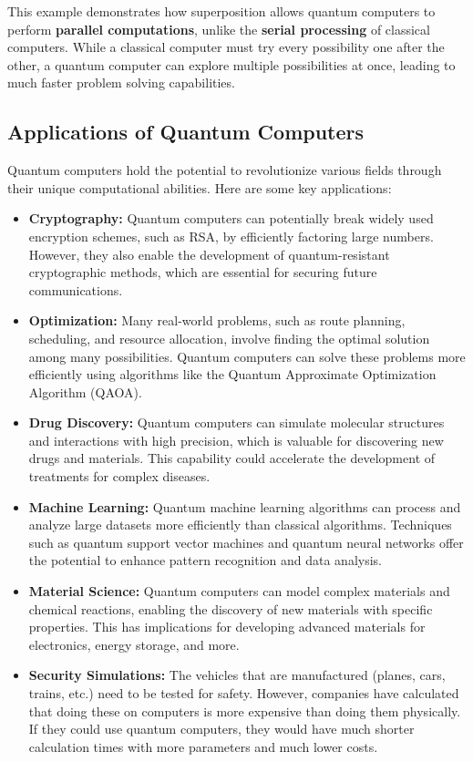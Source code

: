 \documentclass{article}
\begin{document}
This example demonstrates how superposition allows quantum computers to perform \textbf{parallel computations}, unlike the \textbf{serial processing} of classical computers. While a classical computer must try every possibility one after the other, a quantum computer can explore multiple possibilities at once, leading to much faster problem solving capabilities.
\subsection{Applications of Quantum Computers}

Quantum computers hold the potential to revolutionize various fields through their unique computational abilities. Here are some key applications:

\begin{itemize}
    \item \textbf{Cryptography:} Quantum computers can potentially break widely used encryption schemes, such as RSA, by efficiently factoring large numbers. However, they also enable the development of quantum-resistant cryptographic methods, which are essential for securing future communications.
    
    \item \textbf{Optimization:} Many real-world problems, such as route planning, scheduling, and resource allocation, involve finding the optimal solution among many possibilities. Quantum computers can solve these problems more efficiently using algorithms like the Quantum Approximate Optimization Algorithm (QAOA).
    
    \item \textbf{Drug Discovery:} Quantum computers can simulate molecular structures and interactions with high precision, which is valuable for discovering new drugs and materials. This capability could accelerate the development of treatments for complex diseases.
    
    \item \textbf{Machine Learning:} Quantum machine learning algorithms can process and analyze large datasets more efficiently than classical algorithms. Techniques such as quantum support vector machines and quantum neural networks offer the potential to enhance pattern recognition and data analysis.
    
    \item \textbf{Material Science:} Quantum computers can model complex materials and chemical reactions, enabling the discovery of new materials with specific properties. This has implications for developing advanced materials for electronics, energy storage, and more.

    \item \textbf{Security Simulations: } The vehicles that are manufactured (planes, cars, trains, etc.) need to be tested for safety. However, companies have calculated that doing these on computers is more expensive than doing them physically. If they could use quantum computers, they would have much shorter calculation times with more parameters and much lower costs.
\end{itemize}
\end{document}

